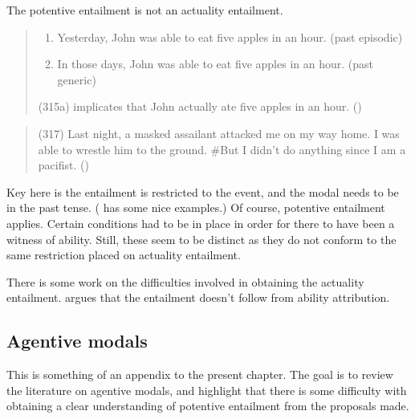 \begin{note}
  The potentive entailment is not an actuality entailment.

  \begin{quote}
    \begin{enumerate}
    \item Yesterday, John was able to eat ﬁve apples in an hour. (past episodic)
    \item In those days, John was able to eat ﬁve apples in an hour. (past generic)
    \end{enumerate}
    (315a) implicates that John actually ate ﬁve apples in an hour.\nolinebreak
    \mbox{}\hfill\mbox{(\citeyear[173]{Bhatt:2008aa})}
  \end{quote}

  \begin{quote}
    (317) Last night, a masked assailant attacked me on my way home.
    I was able to wrestle him to the ground.
    \#But I didn’t do anything since I am a paciﬁst.\nolinebreak
    \mbox{}\hfill\mbox{(\citeyear[174]{Bhatt:2008aa})}
  \end{quote}

  Key here is the entailment is restricted to the event, and the modal needs to be in the past tense.
  (\textcite{Pinon:2003te} has some nice examples.)
  Of course, potentive entailment applies.
  Certain conditions had to be in place in order for there to have been a witness of ability.
  Still, these seem to be distinct as they do not conform to the same restriction placed on actuality entailment.

  There is some work on the difficulties involved in obtaining the actuality entailment.
  \citeauthor{Bhatt:2008aa,Bhatt:1999ud} argues that the entailment doesn't follow from ability attribution.
\end{note}


\subsection{Agentive modals}
\label{sec:agentive-modals}

\begin{note}[Summary]
  This is something of an appendix to the present chapter.
  The goal is to review the literature on agentive modals, and highlight that there is some difficulty with obtaining a clear understanding of potentive entailment from the proposals made.
\end{note}


